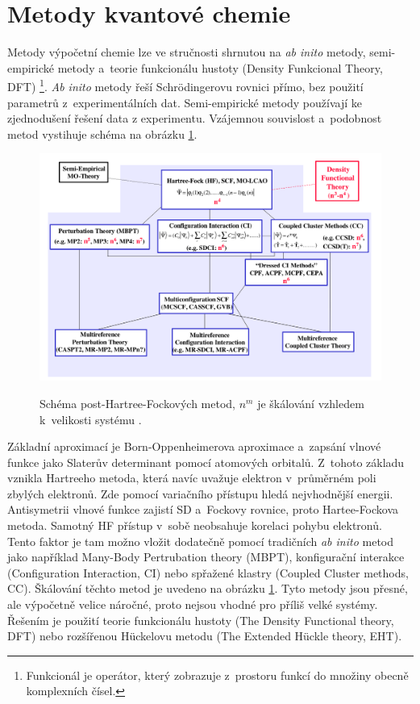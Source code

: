 \documentclass[
  printed, %
  table,   %
  lof,     %
  lot,     %
  oneside,
]{fithesis3}
\begin{document}
\section{Metody kvantové chemie}
Metody výpočetní chemie lze ve stručnosti shrnutou na \textit{ab inito} metody, semi-empirické metody a~teorie funkcionálu hustoty (Density Funkcional Theory, DFT) \footnote{Funkcionál je operátor, který zobrazuje z~prostoru funkcí do množiny obecně komplexních čísel.}. \textit{Ab inito} metody řeší Schrödingerovu rovnici přímo, bez použití parametrů z~experimentálních dat. Semi-empirické metody používají ke zjednodušení řešení data z experimentu. Vzájemnou souvislost a~podobnost metod vystihuje schéma na obrázku \ref{schema_QM}.
 \begin{figure}[h]
\caption{Schéma post-Hartree-Fockových metod, $n^m$ je škálování vzhledem k~velikosti systému \cite{pdf_obrazek}. }
  \center
  \includegraphics[width=12cm]{schema_QM.png}
  \label{schema_QM}
  \end{figure}
     Základní aproximací je Born-Oppenheimerova aproximace a~zapsání vlnové funkce jako Slaterův determinant pomocí atomových orbitalů. Z~tohoto základu vznikla Hartreeho metoda, která navíc uvažuje elektron v~průměrném poli zbylých elektronů. Zde pomocí variačního přístupu hledá nejvhodnější energii. Antisymetrii vlnové funkce zajistí SD a~Fockovy rovnice, proto Hartee-Fockova metoda. Samotný HF přístup v~sobě neobsahuje korelaci pohybu elektronů. Tento faktor je tam možno vložit dodatečně pomocí tradičních \textit{ab inito} metod jako například Many-Body Pertrubation  theory (MBPT), konfigurační interakce (Configuration Interaction, CI) nebo spřažené klastry (Coupled Cluster methods, CC). Škálování těchto metod je uvedeno na obrázku \ref{schema_QM}. Tyto metody jsou přesné, ale výpočetně velice náročné, proto nejsou vhodné pro příliš velké systémy. Řešením je použití teorie funkcionálu hustoty (The Density Functional theory, DFT) nebo rozšířenou Hückelovu metodu (The Extended Hückle theory, EHT).
\end{document}
